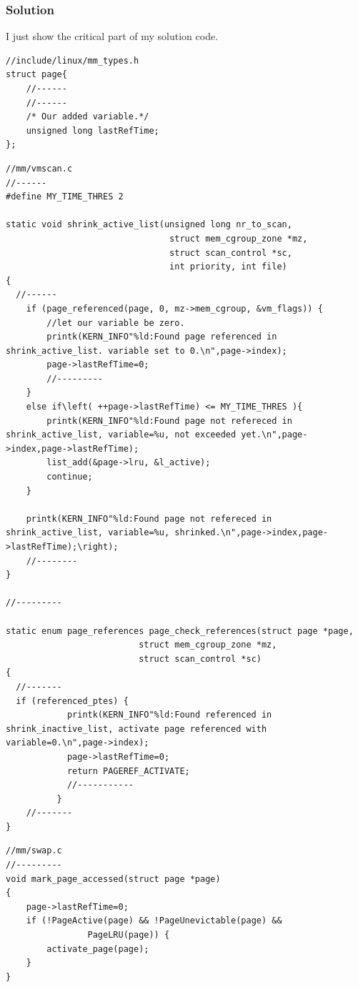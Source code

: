 \documentclass[12pt,a4paper,UTF8]{article}
\theoremstyle{definition}
\numberwithin{equation}{section}
\numberwithin{figure}{section}
\begin{document}
\subsubsection{Solution}
{\color{red}I just show the critical part of my solution code.}
\begin{lstlisting}[style=cmod]
//include/linux/mm_types.h
struct page{
    //------
    //------
    /* Our added variable.*/
    unsigned long lastRefTime;
};
\end{lstlisting}
\begin{lstlisting}[style=cmod]
//mm/vmscan.c
//------
#define MY_TIME_THRES 2

static void shrink_active_list(unsigned long nr_to_scan,
                                struct mem_cgroup_zone *mz,
                                struct scan_control *sc,
                                int priority, int file)
{
  //------
    if (page_referenced(page, 0, mz->mem_cgroup, &vm_flags)) {
        //let our variable be zero.
        printk(KERN_INFO"%ld:Found page referenced in shrink_active_list. variable set to 0.\n",page->index);
        page->lastRefTime=0;
        //---------
    }
    else if\left( ++page->lastRefTime) <= MY_TIME_THRES ){
        printk(KERN_INFO"%ld:Found page not refereced in shrink_active_list, variable=%u, not exceeded yet.\n",page->index,page->lastRefTime);
        list_add(&page->lru, &l_active);
        continue;
    }

    printk(KERN_INFO"%ld:Found page not refereced in shrink_active_list, variable=%u, shrinked.\n",page->index,page->lastRefTime);\right);
    //--------
}

//---------

static enum page_references page_check_references(struct page *page,
                          struct mem_cgroup_zone *mz,
                          struct scan_control *sc)
{
  //-------
  if (referenced_ptes) {
            printk(KERN_INFO"%ld:Found referenced in shrink_inactive_list, activate page referenced with variable=0.\n",page->index);
            page->lastRefTime=0;
            return PAGEREF_ACTIVATE;
            //-----------
          }
    //-------
}
\end{lstlisting}
\begin{lstlisting}[style=cmod]
//mm/swap.c
//---------
void mark_page_accessed(struct page *page)
{
    page->lastRefTime=0;
    if (!PageActive(page) && !PageUnevictable(page) &&
                PageLRU(page)) {
        activate_page(page);
    }
}
\end{lstlisting}
\newpage
\end{document}
